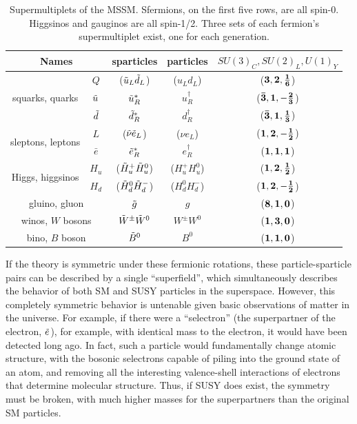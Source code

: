 \begin{table}
\begin{center}
 \begin{tabular}{cc|c|c|c}
   \hline 
   \multicolumn{2}{c|}{Names} & sparticles & particles & $SU(3)_C, SU(2)_L, U(1)_Y$ \\
   \hline
   \hline
   \multirow{3}{*}{squarks, quarks} & $Q$ 		& ($\squ[L] \sqd[L]$) & ($u_L d_L$) 		& ($\bf{3}, \bf{2}, \frac{1}{6}$) 		\\
   									& $\squ$ 	& $\squ[R]^*$ 		& $u^\dagger_R$ 	& ($\bf{\bar{3}}, \bf{1}, -\frac{2}{3}$) 	\\
   									& $\sqd$ 	& $\sqd[R]^*$ 		& $d^\dagger_R$ 	& ($\bf{\bar{3}}, \bf{1}, \frac{1}{3}$) 	\\		
   \hline
   \multirow{2}{*}{sleptons, leptons} & $L$ 	& ($\slneu \sle[L]$) & ($\nu e_L$) 		& ($\bf{1}, \bf{2}, -\frac{1}{2}$) 		\\
   									& $\bar{e}$ & $\sle[R]^*$ 		& $e^\dagger_R$ 	& ($\bf{1}, \bf{1}, 1$) 					\\
   \hline
   \multirow{2}{*}{Higgs, higgsinos} & $H_u$ 	& ($\Hou[+] \Hou[0]$) 	& ($H^+_u H^0_u$)  & ($\bf{1}, \bf{2}, \frac{1}{2}$) 	\\
   									& $H_d$ 	& ($\Hod[0] \Hod[-]$) 	& ($H^0_d H^-_d$)  & ($\bf{1}, \bf{2}, -\frac{1}{2}$) 	\\  
   \hline
   \multicolumn{2}{c|}{gluino, gluon}	& $\go$ 			& $g$			& ($\bf{8}, \bf{1}, 0$)		\\							
   \hline
   \multicolumn{2}{c|}{winos, $W$ bosons}	& $\Wo^\pm \Wo^0$ 	& $W^\pm W^0$	& ($\bf{1}, \bf{3}, 0$)		\\							
   \hline
   \multicolumn{2}{c|}{bino, $B$ boson}	& $\Bo^0$ 			& $B^0$			& ($\bf{1}, \bf{1}, 0$)		\\							

\hline
\hline
 \end{tabular}
\end{center}
 \caption{Supermultiplets of the \ac{MSSM}. Sfermions, on the first five rows, are all spin-0. Higgsinos and gauginos are all spin-1/2. Three sets of each fermion's supermultiplet exist, one for each generation. \cite{Martin:1997ns}}
 \label{tab:sparticles}
\end{table}


If the theory is symmetric under these fermionic rotations, these particle-sparticle pairs can be described by a single ``superfield'', which simultaneously describes the behavior of both \ac{SM} and \ac{SUSY} particles in the superspace. However, this completely symmetric behavior is untenable given basic observations of matter in the universe. For example, if there were a ``selectron'' (the superpartner of the electron, $\sle$), for example, with identical mass to the electron, it would have been detected long ago. In fact, such a particle would fundamentally change atomic structure, with the bosonic selectrons capable of piling into the ground state of an atom, and removing all the interesting valence-shell interactions of electrons that determine molecular structure. Thus, if \ac{SUSY} does exist, the symmetry must be broken, with much higher masses for the superpartners than the original \ac{SM} particles. 

